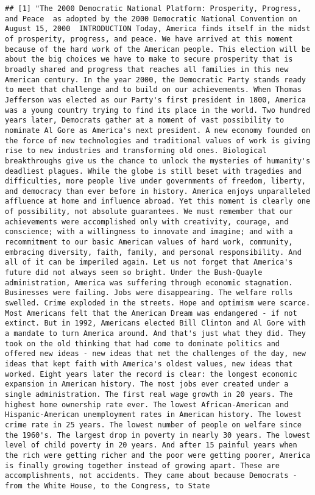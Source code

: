 \documentclass[
]{article}
\begin{document}
\begin{verbatim}
## [1] "The 2000 Democratic National Platform: Prosperity, Progress, and Peace  as adopted by the 2000 Democratic National Convention on August 15, 2000  INTRODUCTION Today, America finds itself in the midst of prosperity, progress, and peace. We have arrived at this moment because of the hard work of the American people. This election will be about the big choices we have to make to secure prosperity that is broadly shared and progress that reaches all families in this new American century. In the year 2000, the Democratic Party stands ready to meet that challenge and to build on our achievements. When Thomas Jefferson was elected as our Party's first president in 1800, America was a young country trying to find its place in the world. Two hundred years later, Democrats gather at a moment of vast possibility to nominate Al Gore as America's next president. A new economy founded on the force of new technologies and traditional values of work is giving rise to new industries and transforming old ones. Biological breakthroughs give us the chance to unlock the mysteries of humanity's deadliest plagues. While the globe is still beset with tragedies and difficulties, more people live under governments of freedom, liberty, and democracy than ever before in history. America enjoys unparalleled affluence at home and influence abroad. Yet this moment is clearly one of possibility, not absolute guarantees. We must remember that our achievements were accomplished only with creativity, courage, and conscience; with a willingness to innovate and imagine; and with a recommitment to our basic American values of hard work, community, embracing diversity, faith, family, and personal responsibility. And all of it can be imperiled again. Let us not forget that America's future did not always seem so bright. Under the Bush-Quayle administration, America was suffering through economic stagnation. Businesses were failing. Jobs were disappearing. The welfare rolls swelled. Crime exploded in the streets. Hope and optimism were scarce. Most Americans felt that the American Dream was endangered - if not extinct. But in 1992, Americans elected Bill Clinton and Al Gore with a mandate to turn America around. And that's just what they did. They took on the old thinking that had come to dominate politics and offered new ideas - new ideas that met the challenges of the day, new ideas that kept faith with America's oldest values, new ideas that worked. Eight years later the record is clear: the longest economic expansion in American history. The most jobs ever created under a single administration. The first real wage growth in 20 years. The highest home ownership rate ever. The lowest African-American and Hispanic-American unemployment rates in American history. The lowest crime rate in 25 years. The lowest number of people on welfare since the 1960's. The largest drop in poverty in nearly 30 years. The lowest level of child poverty in 20 years. And after 15 painful years when the rich were getting richer and the poor were getting poorer, America is finally growing together instead of growing apart. These are accomplishments, not accidents. They came about because Democrats - from the White House, to the Congress, to State 
\end{verbatim}
\end{document}
